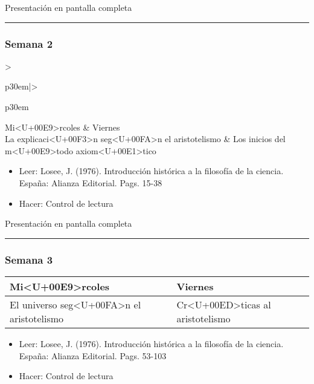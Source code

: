 \documentclass[spanish,]{article}
\begin{document}
Presentación en pantalla completa

\begin{center}\rule{0.5\linewidth}{\linethickness}\end{center}

\subsubsection{Semana 2}\label{semana-2}

\begin{tabular}{>{\raggedright\arraybackslash}p{30em}|>{\raggedright\arraybackslash}p{30em}}
\hline
Mi<U+00E9>rcoles & Viernes\\
\hline
La explicaci<U+00F3>n seg<U+00FA>n el aristotelismo & Los inicios del m<U+00E9>todo axiom<U+00E1>tico\\
\hline
\end{tabular}

\begin{itemize}
\item
  Leer: Losee, J. (1976). Introducción histórica a la filosofía de la
  ciencia. España: Alianza Editorial. Pags. 15-38
\item
  Hacer: Control de lectura
\end{itemize}

Presentación en pantalla completa

\begin{center}\rule{0.5\linewidth}{\linethickness}\end{center}

\subsubsection{Semana 3}\label{semana-3}

\begin{tabular}{>{\raggedright\arraybackslash}p{30em}|>{\raggedright\arraybackslash}p{30em}}
\hline
Mi<U+00E9>rcoles & Viernes\\
\hline
El universo seg<U+00FA>n el aristotelismo & Cr<U+00ED>ticas al aristotelismo\\
\hline
\end{tabular}

\begin{itemize}
\item
  Leer: Losee, J. (1976). Introducción histórica a la filosofía de la
  ciencia. España: Alianza Editorial. Pags. 53-103
\item
  Hacer: Control de lectura
\end{itemize}
\end{document}

